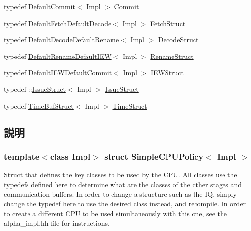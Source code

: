 \begin{DoxyCompactItemize}
\item 
typedef \hyperlink{classDefaultCommit}{DefaultCommit}$<$ Impl $>$ \hyperlink{structSimpleCPUPolicy_af339740e93470f7eee7d2ef7beb245e0}{Commit}
\item 
typedef \hyperlink{structDefaultFetchDefaultDecode}{DefaultFetchDefaultDecode}$<$ Impl $>$ \hyperlink{structSimpleCPUPolicy_a84cf84b07d04291ab6f09af9855f5e30}{FetchStruct}
\item 
typedef \hyperlink{structDefaultDecodeDefaultRename}{DefaultDecodeDefaultRename}$<$ Impl $>$ \hyperlink{structSimpleCPUPolicy_ab1ad5de48172f26d3eef9c002888156f}{DecodeStruct}
\item 
typedef \hyperlink{structDefaultRenameDefaultIEW}{DefaultRenameDefaultIEW}$<$ Impl $>$ \hyperlink{structSimpleCPUPolicy_a68ba62cd715a499d033ad5e7b96aba8c}{RenameStruct}
\item 
typedef \hyperlink{structDefaultIEWDefaultCommit}{DefaultIEWDefaultCommit}$<$ Impl $>$ \hyperlink{structSimpleCPUPolicy_a4e10dd7f3721c1bd03793c428a739ee8}{IEWStruct}
\item 
typedef ::\hyperlink{structIssueStruct}{IssueStruct}$<$ Impl $>$ \hyperlink{structSimpleCPUPolicy_ad9127d90dae1796b4dd1f07421b1ef72}{IssueStruct}
\item 
typedef \hyperlink{structTimeBufStruct}{TimeBufStruct}$<$ Impl $>$ \hyperlink{structSimpleCPUPolicy_a057b9e5b595b4bef4e9c8b4df494845f}{TimeStruct}
\end{DoxyCompactItemize}


\subsection{説明}
\subsubsection*{template$<$class Impl$>$ struct SimpleCPUPolicy$<$ Impl $>$}

Struct that defines the key classes to be used by the CPU. All classes use the typedefs defined here to determine what are the classes of the other stages and communication buffers. In order to change a structure such as the IQ, simply change the typedef here to use the desired class instead, and recompile. In order to create a different CPU to be used simultaneously with this one, see the alpha\_\-impl.hh file for instructions. 

